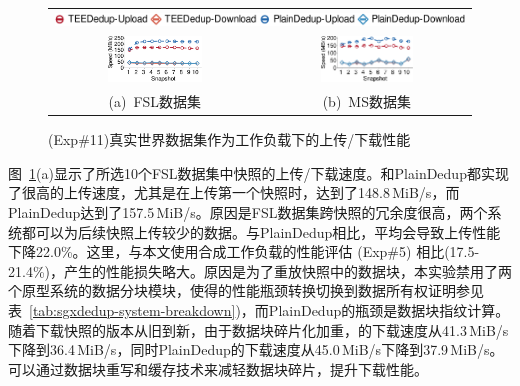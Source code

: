 \begin{figure}[!htb]
  \centering
  \begin{tabular}{@{\ }c@{\ }c}
  \multicolumn{2}{c}{\includegraphics[width=\textwidth]{pic/sgxdedup/expb2_trace_legend.pdf}} \\
  \hspace{-0.1in}
  \includegraphics[width=0.47\textwidth]{pic/sgxdedup/expb2_trace_fsl_plain_sgx.pdf} &
  \includegraphics[width=0.47\textwidth]{pic/sgxdedup/expb2_trace_ms_plain_sgx.pdf}\\
  \mbox{\small (a) FSL数据集} &
  \mbox{\small (b) MS数据集}
  \end{tabular}
  \caption{(Exp\#11)真实世界数据集作为工作负载下的上传/下载性能}
  \label{fig:sgxdedup-tracePerformance}
\end{figure}

图~\ref{fig:sgxdedup-tracePerformance}(a)显示了所选10个FSL数据集中快照的上传/下载速度。\sysnameS 和PlainDedup都实现了很高的上传速度，尤其是在上传第一个快照时，\sysnameS 达到了148.8\,MiB/s，而PlainDedup达到了157.5\,MiB/s。原因是FSL数据集跨快照的冗余度很高，两个系统都可以为后续快照上传较少的数据。与PlainDedup相比，\sysnameS 平均会导致上传性能下降22.0\%。这里，与本文使用合成工作负载的性能评估 (Exp\#5) 相比(17.5-21.4\%)，产生的性能损失略大。原因是为了重放快照中的数据块，本实验禁用了两个原型系统的数据分块模块，使得\sysnameS 的性能瓶颈转换切换到数据所有权证明参见表~\ref{tab:sgxdedup-system-breakdown})，而PlainDedup的瓶颈是数据块指纹计算。随着下载快照的版本从旧到新，由于数据块碎片化\cite{lillibridge13}加重，\sysnameS 的下载速度从41.3\,MiB/s下降到36.4\,MiB/s，同时PlainDedup的下载速度从45.0\,MiB/s下降到37.9\,MiB/s。\sysnameS 可以通过数据块重写和缓存\cite{lillibridge13,cao2018ALACC}技术来减轻数据块碎片，提升下载性能。

